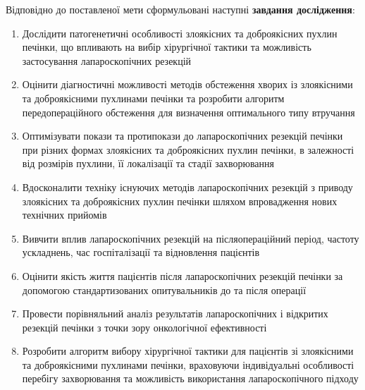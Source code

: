 Відповідно до поставленої мети сформульовані наступні \textbf{завдання дослідження}:
\begin{enumerate}
    \item Дослідити патогенетичні особливості злоякісних та доброякісних пухлин печінки, що впливають на вибір хірургічної тактики та можливість застосування лапароскопічних резекцій
    
    
    \item Оцінити діагностичні можливості методів обстеження хворих із злоякісними та доброякісними пухлинами печінки та розробити алгоритм передопераційного обстеження для визначення оптимального типу втручання
    
    
    \item Оптимізувати покази та протипокази до лапароскопічних резекцій печінки при різних формах злоякісних та доброякісних пухлин печінки, в залежності від розмірів пухлини, її локалізації та стадії захворювання
    
    \item Вдосконалити техніку існуючих методів лапароскопічних резекцій з приводу злоякісних та доброякісних пухлин печінки шляхом впровадження нових технічних прийомів
    
    
    \item Вивчити вплив лапароскопічних резекцій на післяопераційний період, частоту ускладнень, час госпіталізації та відновлення пацієнтів
    
    
    \item Оцінити якість життя пацієнтів після лапароскопічних резекцій печінки за допомогою стандартизованих опитувальників до та після операції
    
    
    \item Провести порівняльний аналіз результатів лапароскопічних і відкритих резекцій печінки з точки зору онкологічної ефективності
    
    
    \item Розробити алгоритм вибору хірургічної тактики для пацієнтів зі злоякісними та доброякісними пухлинами печінки, враховуючи індивідуальні особливості перебігу захворювання та можливість використання лапароскопічного підходу
    
    
\end{enumerate}


